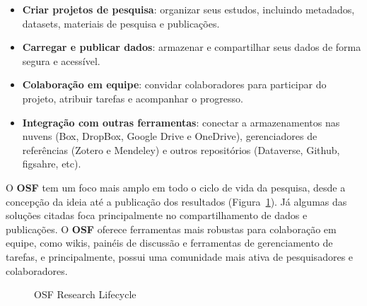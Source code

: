 \documentclass[
  a4paper,
]{book}
\providecommand{\tightlist}{%
  \setlength{\itemsep}{0pt}\setlength{\parskip}{0pt}}\usepackage{longtable,booktabs,array}
\begin{document}
\begin{itemize}
\tightlist
\item
  \textbf{Criar projetos de pesquisa}: organizar seus estudos, incluindo
  metadados, datasets, materiais de pesquisa e publicações.
\item
  \textbf{Carregar e publicar dados}: armazenar e compartilhar seus
  dados de forma segura e acessível.
\item
  \textbf{Colaboração em equipe}: convidar colaboradores para participar
  do projeto, atribuir tarefas e acompanhar o progresso.
\item
  \textbf{Integração com outras ferramentas}: conectar a armazenamentos
  nas nuvens (Box, DropBox, Google Drive e OneDrive), gerenciadores de
  referências (Zotero e Mendeley) e outros repositórios (Dataverse,
  Github, figsahre, etc).
\end{itemize}

O \textbf{OSF} tem um foco mais amplo em todo o ciclo de vida da
pesquisa, desde a concepção da ideia até a publicação dos resultados
(Figura~\ref{fig-osf-researchcycle}). Já algumas das soluções citadas
foca principalmente no compartilhamento de dados e publicações. O
\textbf{OSF} oferece ferramentas mais robustas para colaboração em
equipe, como wikis, painéis de discussão e ferramentas de gerenciamento
de tarefas, e principalmente, possui uma comunidade mais ativa de
pesquisadores e colaboradores.

\begin{figure}


\caption{\label{fig-osf-researchcycle}OSF Research Lifecycle}

\end{figure}%
\end{document}
